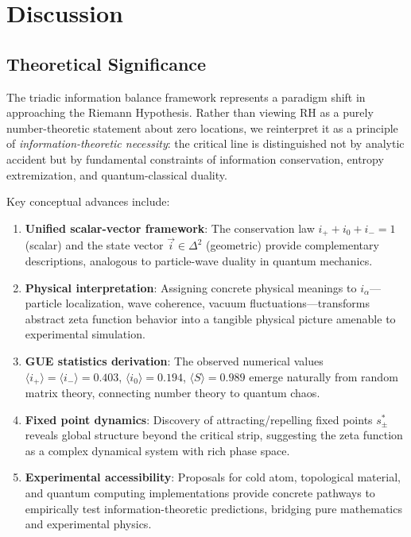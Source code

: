 \documentclass[12pt]{article}
\theoremstyle{plain}
\theoremstyle{definition}
\begin{document}
\section{Discussion}

\subsection{Theoretical Significance}

The triadic information balance framework represents a paradigm shift in approaching the Riemann Hypothesis. Rather than viewing RH as a purely number-theoretic statement about zero locations, we reinterpret it as a principle of \emph{information-theoretic necessity}: the critical line is distinguished not by analytic accident but by fundamental constraints of information conservation, entropy extremization, and quantum-classical duality.

Key conceptual advances include:

\begin{enumerate}
\item \textbf{Unified scalar-vector framework}: The conservation law $i_+ + i_0 + i_- = 1$ (scalar) and the state vector $\vec{i} \in \Delta^2$ (geometric) provide complementary descriptions, analogous to particle-wave duality in quantum mechanics.

\item \textbf{Physical interpretation}: Assigning concrete physical meanings to $i_\alpha$—particle localization, wave coherence, vacuum fluctuations—transforms abstract zeta function behavior into a tangible physical picture amenable to experimental simulation.

\item \textbf{GUE statistics derivation}: The observed numerical values $\langle i_+ \rangle = \langle i_- \rangle = 0.403$, $\langle i_0 \rangle = 0.194$, $\langle S \rangle = 0.989$ emerge naturally from random matrix theory, connecting number theory to quantum chaos.

\item \textbf{Fixed point dynamics}: Discovery of attracting/repelling fixed points $s_\pm^*$ reveals global structure beyond the critical strip, suggesting the zeta function as a complex dynamical system with rich phase space.

\item \textbf{Experimental accessibility}: Proposals for cold atom, topological material, and quantum computing implementations provide concrete pathways to empirically test information-theoretic predictions, bridging pure mathematics and experimental physics.
\end{enumerate}
\end{document}
